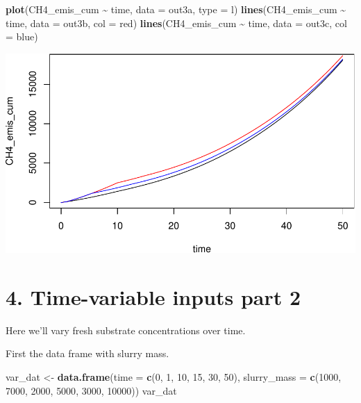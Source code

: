 \documentclass[
]{article}
\newenvironment{Shaded}{\begin{snugshade}}{\end{snugshade}}
\newcommand{\AttributeTok}[1]{\textcolor[rgb]{0.13,0.29,0.53}{#1}}
\newcommand{\DecValTok}[1]{\textcolor[rgb]{0.00,0.00,0.81}{#1}}
\newcommand{\FunctionTok}[1]{\textcolor[rgb]{0.13,0.29,0.53}{\textbf{#1}}}
\newcommand{\NormalTok}[1]{#1}
\newcommand{\OtherTok}[1]{\textcolor[rgb]{0.56,0.35,0.01}{#1}}
\newcommand{\SpecialCharTok}[1]{\textcolor[rgb]{0.81,0.36,0.00}{\textbf{#1}}}
\newcommand{\StringTok}[1]{\textcolor[rgb]{0.31,0.60,0.02}{#1}}
\begin{document}
\begin{Shaded}
\begin{Highlighting}[]
\FunctionTok{plot}\NormalTok{(CH4\_emis\_cum }\SpecialCharTok{\textasciitilde{}}\NormalTok{ time, }\AttributeTok{data =}\NormalTok{ out3a, }\AttributeTok{type =} \StringTok{\textquotesingle{}l\textquotesingle{}}\NormalTok{)}
\FunctionTok{lines}\NormalTok{(CH4\_emis\_cum }\SpecialCharTok{\textasciitilde{}}\NormalTok{ time, }\AttributeTok{data =}\NormalTok{ out3b, }\AttributeTok{col =} \StringTok{\textquotesingle{}red\textquotesingle{}}\NormalTok{)}
\FunctionTok{lines}\NormalTok{(CH4\_emis\_cum }\SpecialCharTok{\textasciitilde{}}\NormalTok{ time, }\AttributeTok{data =}\NormalTok{ out3c, }\AttributeTok{col =} \StringTok{\textquotesingle{}blue\textquotesingle{}}\NormalTok{)}
\end{Highlighting}
\end{Shaded}

\includegraphics{simple_demo_files/figure-latex/unnamed-chunk-21-1.pdf}

\hypertarget{time-variable-inputs-part-2}{%
\section{4. Time-variable inputs part
2}\label{time-variable-inputs-part-2}}

Here we'll vary fresh substrate concentrations over time.

First the data frame with slurry mass.

\begin{Shaded}
\begin{Highlighting}[]
\NormalTok{var\_dat }\OtherTok{\textless{}{-}} \FunctionTok{data.frame}\NormalTok{(}\AttributeTok{time =} \FunctionTok{c}\NormalTok{(}\DecValTok{0}\NormalTok{, }\DecValTok{1}\NormalTok{, }\DecValTok{10}\NormalTok{, }\DecValTok{15}\NormalTok{, }\DecValTok{30}\NormalTok{, }\DecValTok{50}\NormalTok{), }
                      \AttributeTok{slurry\_mass =} \FunctionTok{c}\NormalTok{(}\DecValTok{1000}\NormalTok{, }\DecValTok{7000}\NormalTok{, }\DecValTok{2000}\NormalTok{, }\DecValTok{5000}\NormalTok{, }\DecValTok{3000}\NormalTok{, }\DecValTok{10000}\NormalTok{))}
\NormalTok{var\_dat}
\end{Highlighting}
\end{Shaded}
\end{document}
